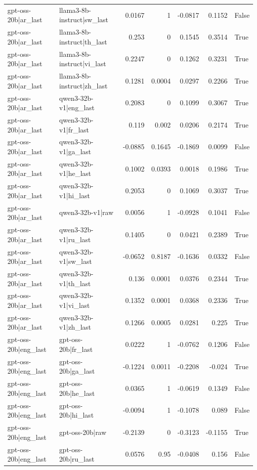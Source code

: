 \begin{table}
\begin{tabular}{l l r r r r l}
gpt-oss-20b|ar_last & llama3-8b-instruct|sw_last & 0.0167 & 1 & -0.0817 & 0.1152 & False \\
gpt-oss-20b|ar_last & llama3-8b-instruct|th_last & 0.253 & 0 & 0.1545 & 0.3514 & True \\
gpt-oss-20b|ar_last & llama3-8b-instruct|vi_last & 0.2247 & 0 & 0.1262 & 0.3231 & True \\
gpt-oss-20b|ar_last & llama3-8b-instruct|zh_last & 0.1281 & 0.0004 & 0.0297 & 0.2266 & True \\
gpt-oss-20b|ar_last & qwen3-32b-v1|eng_last & 0.2083 & 0 & 0.1099 & 0.3067 & True \\
gpt-oss-20b|ar_last & qwen3-32b-v1|fr_last & 0.119 & 0.002 & 0.0206 & 0.2174 & True \\
gpt-oss-20b|ar_last & qwen3-32b-v1|ga_last & -0.0885 & 0.1645 & -0.1869 & 0.0099 & False \\
gpt-oss-20b|ar_last & qwen3-32b-v1|he_last & 0.1002 & 0.0393 & 0.0018 & 0.1986 & True \\
gpt-oss-20b|ar_last & qwen3-32b-v1|hi_last & 0.2053 & 0 & 0.1069 & 0.3037 & True \\
gpt-oss-20b|ar_last & qwen3-32b-v1|raw & 0.0056 & 1 & -0.0928 & 0.1041 & False \\
gpt-oss-20b|ar_last & qwen3-32b-v1|ru_last & 0.1405 & 0 & 0.0421 & 0.2389 & True \\
gpt-oss-20b|ar_last & qwen3-32b-v1|sw_last & -0.0652 & 0.8187 & -0.1636 & 0.0332 & False \\
gpt-oss-20b|ar_last & qwen3-32b-v1|th_last & 0.136 & 0.0001 & 0.0376 & 0.2344 & True \\
gpt-oss-20b|ar_last & qwen3-32b-v1|vi_last & 0.1352 & 0.0001 & 0.0368 & 0.2336 & True \\
gpt-oss-20b|ar_last & qwen3-32b-v1|zh_last & 0.1266 & 0.0005 & 0.0281 & 0.225 & True \\
gpt-oss-20b|eng_last & gpt-oss-20b|fr_last & 0.0222 & 1 & -0.0762 & 0.1206 & False \\
gpt-oss-20b|eng_last & gpt-oss-20b|ga_last & -0.1224 & 0.0011 & -0.2208 & -0.024 & True \\
gpt-oss-20b|eng_last & gpt-oss-20b|he_last & 0.0365 & 1 & -0.0619 & 0.1349 & False \\
gpt-oss-20b|eng_last & gpt-oss-20b|hi_last & -0.0094 & 1 & -0.1078 & 0.089 & False \\
gpt-oss-20b|eng_last & gpt-oss-20b|raw & -0.2139 & 0 & -0.3123 & -0.1155 & True \\
gpt-oss-20b|eng_last & gpt-oss-20b|ru_last & 0.0576 & 0.95 & -0.0408 & 0.156 & False \\

\end{tabular}
\end{table}

